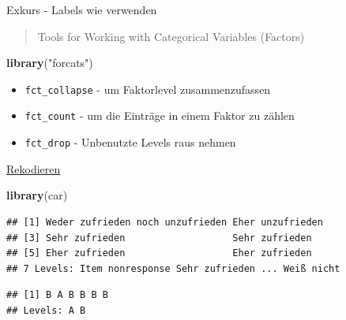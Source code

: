 \documentclass[ignorenonframetext,]{beamer}
\newenvironment{Shaded}{}{}
\newcommand{\KeywordTok}[1]{\textcolor[rgb]{0.00,0.44,0.13}{\textbf{{#1}}}}
\newcommand{\StringTok}[1]{\textcolor[rgb]{0.25,0.44,0.63}{{#1}}}
\newcommand{\NormalTok}[1]{{#1}}
\providecommand{\tightlist}{%
\setlength{\itemsep}{0pt}\setlength{\parskip}{0pt}}
\begin{document}
\begin{frame}[fragile]{Exkurs - Labels wie verwenden}

\begin{quote}
Tools for Working with Categorical Variables (Factors)
\end{quote}

\begin{Shaded}
\begin{Highlighting}[]
\KeywordTok{library}\NormalTok{(}\StringTok{"forcats"}\NormalTok{)}
\end{Highlighting}
\end{Shaded}

\begin{itemize}
\tightlist
\item
  \texttt{fct\_collapse} - um Faktorlevel zusammenzufassen
\item
  \texttt{fct\_count} - um die Einträge in einem Faktor zu zählen
\item
  \texttt{fct\_drop} - Unbenutzte Levels raus nehmen
\end{itemize}

\end{frame}

\begin{frame}[fragile]{\href{https://www.r-bloggers.com/recoding-variables-in-r-pedagogic-considerations/}{Rekodieren}}

\begin{Shaded}
\begin{Highlighting}[]
\KeywordTok{library}\NormalTok{(car)}
\end{Highlighting}
\end{Shaded}

\begin{Shaded}
\end{Shaded}

\begin{verbatim}
## [1] Weder zufrieden noch unzufrieden Eher unzufrieden                
## [3] Sehr zufrieden                   Sehr zufrieden                  
## [5] Eher zufrieden                   Eher zufrieden                  
## 7 Levels: Item nonresponse Sehr zufrieden ... Weiß nicht
\end{verbatim}

\begin{Shaded}
\end{Shaded}

\begin{verbatim}
## [1] B A B B B B
## Levels: A B
\end{verbatim}

\end{frame}
\end{document}
